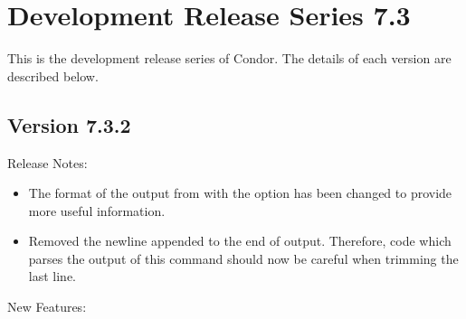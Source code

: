 
\section{Development Release Series 7.3}\label{sec:History-7-3}

This is the development release series of Condor.
The details of each version are described below.

\subsection*{\label{sec:New-7-3-2}Version 7.3.2}

\noindent Release Notes:

\begin{itemize}

\item The format of the output from  with the  option
has been changed to provide more useful information.

\item Removed the newline appended to the end of 
 output.
Therefore, code which parses the output of this command should now
be careful when trimming the last line.

\end{itemize}

\noindent New Features:

